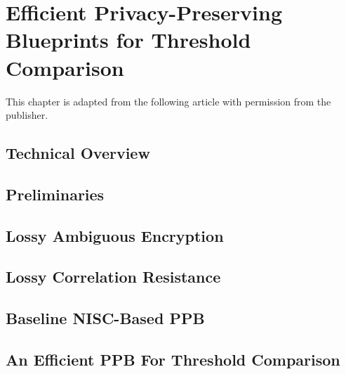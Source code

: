 \chapter{Efficient Privacy-Preserving Blueprints for Threshold Comparison}
\label{chap:ppbs}

\begin{singlespace}

	This chapter is adapted from the following article with permission from the publisher.

\end{singlespace}

% 

\section{Technical Overview}


\section{Preliminaries}


\section{Lossy Ambiguous Encryption}


\section{Lossy Correlation Resistance}


\section{Baseline NISC-Based PPB}
\label{sec:baseline-ppb}


\section{An Efficient PPB For Threshold Comparison}



